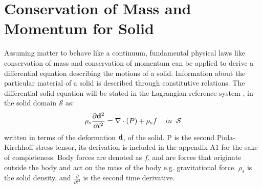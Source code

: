 \section{Conservation of Mass and Momentum for Solid}
Assuming matter to behave like a continuum, fundamental physical laws like conservation of mass and conservation of momentum can be applied to derive a differential equation describing the motions of a solid. Information about the particular material of a solid is described through constitutive relations.
The differential solid equation will be stated in the Lagrangian reference system \cite{Holzapfel2000}, in the solid domain $\mathcal{S}$ as:
\begin{equation}\label{eq:Solid}
\rho_s \frac{\partial \bold{d}^2}{\partial t^2} = \nabla \cdot ( P ) + \rho_s f  \hspace{4mm} in \hspace{2mm} \mathcal{S}
\end{equation}
written in terms of the deformation $\bold{d}$, of the solid.
P is the second Piola-Kirchhoff stress tensor, its derivation is included in the appendix A1 for the sake of completeness.
Body forces are denoted as $f$, and are forces that originate outside the body and act on the mass of the body e.g. gravitational force. $\rho_s$ is the solid density, and $\frac{\partial}{\partial t^2}$ is the second time derivative. 

\begin{comment}
\subsection*{Locking}
The problem og shear locking can happen FEM computations with certain elements. 
[mek4250 Kent] - Locking occurs if  $ \lambda >> \nu $ that is, the material is nearly incompressible. The reason is that all the elements discussed in this course are poor at approximating the divergence. Locking refers to the case where the displacement is to small because the divergence term essentially lock the displacement. It is a numerical artifact not a physical feature. [Verbatum]
\end{comment}
